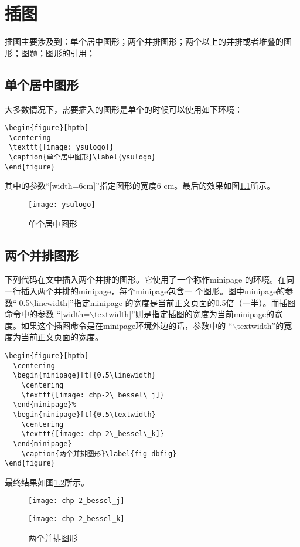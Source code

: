 \chapter{插图}
\label{chap:figures}

插图主要涉及到：单个居中图形；两个并排图形；两个以上的并排或者堆叠的图形；图题；图形的引用；

\section{单个居中图形}

大多数情况下，需要插入的图形是单个的时候可以使用如下环境：

\begin{verbatim}
\begin{figure}[hptb]
 \centering
 \texttt{[image: ysulogo]}
 \caption{单个居中图形}\label{ysulogo}
\end{figure}
\end{verbatim}

其中的参数“[width=6cm]”指定图形的宽度6 cm。最后的效果如图\ref{ysulogo}所示。
\begin{figure}[hptb]
 \centering
 \texttt{[image: ysulogo]}
 \caption{单个居中图形}\label{ysulogo}
\end{figure}

\section{两个并排图形}
下列代码在文中插入两个并排的图形。它使用了一个称作minipage
的环境。在同一行插入两个并排的minipage，每个minipage包含一
个图形。图中minipage的参数“[0.5$\backslash$linewidth]”指定minipage
的宽度是当前正文页面的0.5倍（一半）。而插图命令中的参数
“[width=$\backslash$textwidth]”则是指定插图的宽度为当前minipage的宽
度。如果这个插图命令是在minipage环境外边的话，参数中的
“$\backslash$textwidth”的宽度为当前正文页面的宽度。
\begin{verbatim}
\begin{figure}[hptb]
  \centering
  \begin{minipage}[t]{0.5\linewidth}
    \centering
    \texttt{[image: chp-2\_bessel\_j]}
  \end{minipage}%
  \begin{minipage}[t]{0.5\textwidth}
    \centering
    \texttt{[image: chp-2\_bessel\_k]}
  \end{minipage}
    \caption{两个并排图形}\label{fig-dbfig}
\end{figure}
\end{verbatim}
最终结果如图\ref{fig-dbfig}所示。
\begin{figure}[hptb]
  \centering
  \begin{minipage}[t]{0.5\linewidth}
    \centering
    \texttt{[image: chp-2\_bessel\_j]}
  \end{minipage}%
  \begin{minipage}[t]{0.5\textwidth}
    \centering
    \texttt{[image: chp-2\_bessel\_k]}
  \end{minipage}
    \caption{两个并排图形}\label{fig-dbfig}
 \end{figure}

